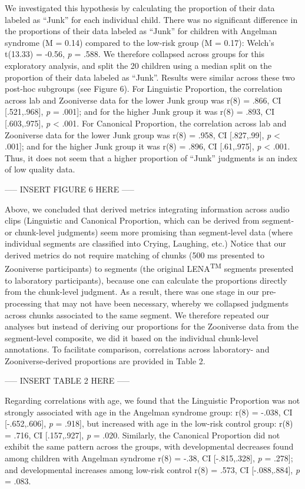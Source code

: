 \documentclass[english,,man]{apa6}
\begin{document}
We investigated this hypothesis by calculating the proportion of their data labeled as \enquote{Junk} for each individual child. There was no significant difference in the proportions of their data labeled as \enquote{Junk} for children with Angelman syndrome (M = 0.14) compared to the low-risk group (M = 0.17): Welch's t(13.33) = -0.56, \emph{p} = .588. We therefore collapsed across groups for this exploratory analysis, and split the 20 children using a median split on the proportion of their data labeled as \enquote{Junk}. Results were similar across these two post-hoc subgroups (see Figure 6). For Linguistic Proportion, the correlation across lab and Zooniverse data for the lower Junk group was r(8) = .866, CI {[}.521,.968{]}, \emph{p} = .001{]}; and for the higher Junk group it was r(8) = .893, CI {[}.603,.975{]}, \emph{p} \textless{} .001. For Canonical Proportion, the correlation across lab and Zooniverse data for the lower Junk group was r(8) = .958, CI {[}.827,.99{]}, \emph{p} \textless{} .001{]}; and for the higher Junk group it was r(8) = .896, CI {[}.61,.975{]}, \emph{p} \textless{} .001. Thus, it does not seem that a higher proportion of \enquote{Junk} judgments is an index of low quality data.

----- INSERT FIGURE 6 HERE -----

Above, we concluded that derived metrics integrating information across audio clips (Linguistic and Canonical Proportion, which can be derived from segment- or chunk-level judgments) seem more promising than segment-level data (where individual segments are classified into Crying, Laughing, etc.) Notice that our derived metrics do not require matching of chunks (500 ms presented to Zooniverse participants) to segments (the original LENA\textsuperscript{TM} segments presented to laboratory participants), because one can calculate the proportions directly from the chunk-level judgment. As a result, there was one stage in our pre-processing that may not have been necessary, whereby we collapsed judgments across chunks associated to the same segment. We therefore repeated our analyses but instead of deriving our proportions for the Zooniverse data from the segment-level composite, we did it based on the individual chunk-level annotations. To facilitate comparison, correlations across laboratory- and Zooniverse-derived proportions are provided in Table 2.

----- INSERT TABLE 2 HERE -----

Regarding correlations with age, we found that the Linguistic Proportion was not strongly associated with age in the Angelman syndrome group: r(8) = -.038, CI {[}-.652,.606{]}, \emph{p} = .918{]}, but increased with age in the low-risk control group: r(8) = .716, CI {[}.157,.927{]}, \emph{p} = .020. Similarly, the Canonical Proportion did not exhibit the same pattern across the groups, with developmental decreases found among children with Angelman syndrome r(8) = -.38, CI {[}-.815,.328{]}, \emph{p} = .278{]}; and developmental increases among low-risk control r(8) = .573, CI {[}-.088,.884{]}, \emph{p} = .083.
\end{document}
